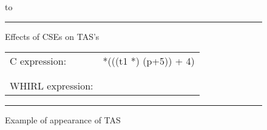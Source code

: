\documentclass{article}
\begin{document}
\begin{figure}
\hbox to 
\hrule
\caption{Effects of CSEs on TAS's}
\label{effect-of-cse-on-tas}
\end{figure}

\begin{figure}
\begin{tabular}{ll}
C expression: & *(((t1 *) (p+5)) + 4) \\
&\\
&\\
WHIRL expression: & 
\vbox{\begin{minipage}{2in}
\begin{verbatim}
        U4U4LDID p
        I4INTCONST 20
      U4ADD
    U4TAS t1
    I4INTCONST 16 
  U4ADD
I4I4LOAD 0

\end{verbatim}
\end{minipage}}\\
\end{tabular}
\hrule
\caption{Example of appearance of TAS}
\label{example-appear-tas}
\end{figure}
\end{document}
